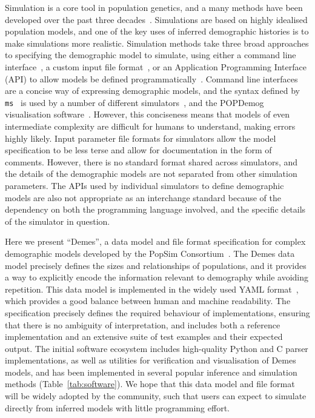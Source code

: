 \documentclass[11pt]{article}
\newcommand{\ms}[0]{\texttt{ms}}
\begin{document}
Simulation is a core tool in population genetics, and a
many methods have been developed over the past three
decades~\citep{carvajal2008simulation,liu2008survey,
arenas2012simulation,yuan2012overview,hoban2012computer}.
Simulations are based on highly idealised population models,
and one of the key uses of inferred demographic histories
is to make simulations more realistic.
Simulation methods take three broad approaches to specifying
the demographic model to simulate,
using either a command line
interface~\citep[e.g.][]{hudson2002generating,kern2016discoal},
a custom input file
format~\citep[e.g.][]{guillaume2006nemo,excoffier2011fastsimcoal,shlyakhter2014cosi2},
or an Application Programming Interface (API) to allow
models be defined programmatically~\citep[e.g.][]{
thornton2014cpp,thornton2019-nu,baumdicker2021-iu,kelleher2016efficient,becheler2019quetzal,haller2019slim}.
Command line interfaces are a concise way of expressing
demographic models, and the syntax defined by \ms~\citep{hudson2002generating}
is used by a number of different
simulators~\citep[e.g.][]{ewing2010msms,chen2009fast,staab2015scrm},
and the POPDemog visualisation software~\citep{zhou2018popdemog}.
However, this conciseness means that models of even intermediate complexity
are difficult for humans to understand, making errors highly likely.
Input parameter file formats for simulators allow the model specification
to be less terse and allow for documentation in the form of comments.
However, there is no standard format shared across simulators,
and the details of the demographic models are not separated
from other simulation parameters.
The APIs used by individual simulators to define demographic models are also
not appropriate as an interchange standard because of the dependency on both
the programming language involved,
and the specific details of the simulator in question.

Here we present ``Demes'', a data model and file format specification for
complex demographic models developed by the
PopSim Consortium~\citep{adrion2020community}.
The Demes data model precisely defines the sizes and relationships
of populations, and it provides a way to explicitly encode the
information relevant to demography while avoiding repetition.
This data model is implemented in the widely used YAML
format~\citep{ben2009yaml}, which provides a good balance between human
and machine readability.
The specification precisely defines the required behaviour of implementations,
ensuring that there is no ambiguity of interpretation, and includes both a
reference implementation and an extensive suite of test examples and their
expected output.
The initial software ecosystem includes high-quality Python
and C parser implementations, as well as utilities for verification and
visualisation of Demes models, and has been implemented in several popular
inference and simulation methods (Table~\ref{tab:software}).
We hope that this data model and file format will be widely adopted
by the community, such that users can expect to simulate directly
from inferred models with little programming effort.
\end{document}

